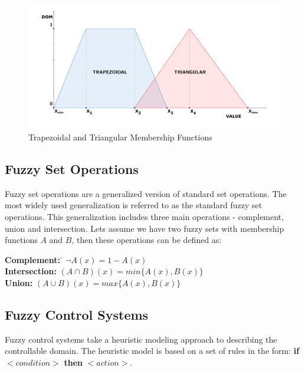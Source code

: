 \begin{figure}[h]
\centering
\includegraphics[scale=0.58]{2/figures/sample_sets.pdf}
\caption{Trapezoidal and Triangular Membership Functions}
\label{sample_fuzzy_sets}
\end{figure}

\subsection{Fuzzy Set Operations}

Fuzzy set operations \cite{fuzzy_sets} are a generalized version of standard set operations. The most widely used generalization is referred to as the standard fuzzy set operations. This generalization includes three main operations - complement, union and intersection. Lets assume we have two fuzzy sets with membership functions $A$ and $B$, then these operations can be defined as: 

\begin{tabbing}
\textbf{Complement:}\hspace{1em} \= $\neg A(x) = 1 - A(x)$\\
\textbf{Intersection:}\hspace{1em} \> $(A \cap B)(x) = min\{A(x), B(x)\}$\\
\textbf{Union:}\hspace{1em} \> $(A \cup B)(x) = max\{A(x), B(x)\}$\\
\end{tabbing}

\subsection{Fuzzy Control Systems}

Fuzzy control systems \cite{fuzzy_control_introduction} take a heuristic modeling approach to describing the controllable domain. The heuristic model is based on a set of rules in the form: \textbf{if} $<condition>$ \textbf{then} $<action>$. 

